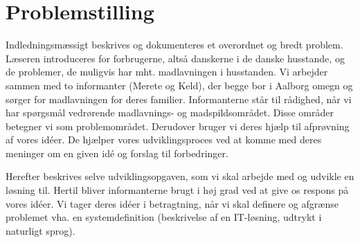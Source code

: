 \chapter{Problemstilling}
\label{chap:problemstilling}

Indledningsmæssigt beskrives og dokumenteres et overordnet og bredt problem. Læseren introduceres for forbrugerne, altså danskerne i de danske husstande, og de problemer, de muligvis har mht. madlavningen i husstanden. Vi arbejder sammen med to informanter (Merete og Keld), der begge bor i Aalborg omegn og sørger for madlavningen for deres familier. Informanterne står til rådighed, når vi har spørgsmål vedrørende \fx madlavnings- og madspildsområdet. Disse områder betegner vi som problemområdet. Derudover bruger vi deres hjælp til afprøvning af vores idéer. De hjælper vores udviklingsproces ved at komme med deres meninger om en given idé og forslag til forbedringer.

Herefter beskrives selve udviklingsopgaven, som vi skal arbejde med og udvikle en løsning til. Hertil bliver informanterne brugt i høj grad ved at give os respons på vores idéer. Vi tager deres idéer i betragtning, når vi skal definere og afgrænse problemet vha. en systemdefinition (beskrivelse af en IT-løsning, udtrykt i naturligt sprog).


%



